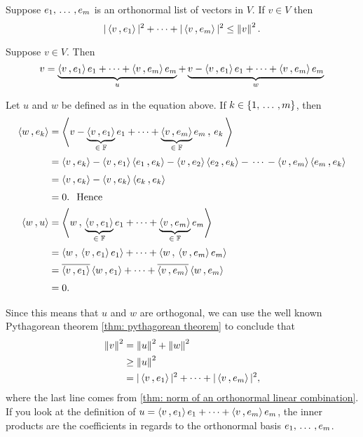 \begin{thm}
  \label{thm: Bessel's inequality}
  Suppose $e_1, {\, \ldots \,\,}, e_m$ is an orthonormal list of vectors in $V$. If $v \in V$ then
  \begin{equation}
    |\ip{v}{e_1}|^2 + \cdots + |\ip{v}{e_m}|^2 \leq \norm{v}^2.
  \end{equation}
\end{thm}
\begin{prf}
  Suppose $v \in V$. Then
  \begin{equation}
    v= \underbrace{\ip{v}{e_1}e_1 + \cdots + \ip{v}{e_m} e_m}_u + \underbrace{v - \ip{v}{e_1}e_1 + \cdots + \ip{v}{e_m} e_m}_w
  \end{equation}

  Let $u$ and $w$ be defined as in the equation above. If $k \in \{1, {\, \ldots \,\,}, m\}$, then
  \begin{equation}
    \begin{aligned}
      \ip{w}{e_k}
      &=\ip{v - \underbrace{\ip{v}{e_1}}_{\in \; \myF}e_1 + \cdots + \underbrace{\ip{v}{e_m}}_{\in \; \myF} e_m}{ \,e_k \,} \\
      &=\ip{v}{e_k} - \ip{v}{e_1}\ip{e_1}{e_k} - \ip{v}{e_2}\ip{e_2}{e_k} - \, \cdots \, - \ip{v}{e_m}\ip{e_m}{e_k} \\
      &=\ip{v}{e_k} - \ip{v}{e_k}\ip{e_k}{e_k} \\
      &=0. \mytext{Hence} \\
      \ip{w}{u}
      & = \ip{w}{\underbrace{\ip{v}{e_1}}_{\in \; \myF}e_1 + \cdots + \underbrace{\ip{v}{e_m}}_{\in \; \myF} e_m} \\
      & = \ip{w}{\ip{v}{e_1}e_1} + \cdots + \ip{w}{\ip{v}{e_m}e_m} \\
      & = \overline{\ip{v}{e_1}}\ip{w}{e_1} + \cdots + \overline{\ip{v}{e_m}}\ip{w}{e_m} \\
      & = 0.
    \end{aligned}
  \end{equation}

  Since this means that $u$ and $w$ are orthogonal, we can use the well known Pythagorean theorem \ref{thm: pythagorean theorem} to conclude that
  \begin{equation}
    \begin{aligned}
      \norm{v}^2
      &=    \norm{u}^2 + \norm{w}^2 \\
      &\geq \norm{u}^2 \\
      &= |\ip{v}{e_1}|^2 + \cdots + |\ip{v}{e_m}|^2,
    \end{aligned}
  \end{equation}
  where the last line comes from \ref{thm: norm of an orthonormal linear combination}. If you look at the definition of $u=\ip{v}{e_1}e_1 + \cdots + \ip{v}{e_m} e_m$, the inner products are the coefficients in regards to the orthonormal basis $e_1, {\, \ldots \,\,}, e_m$.
\end{prf}

